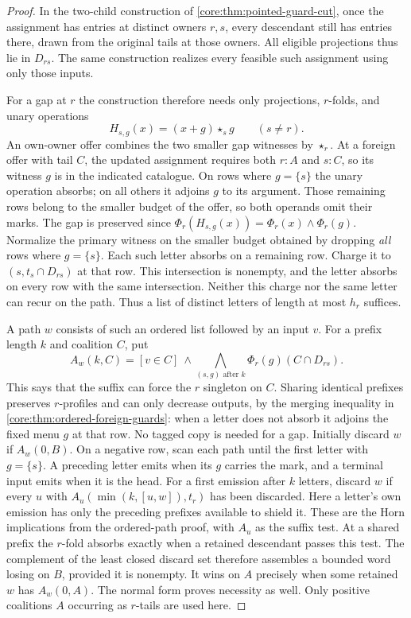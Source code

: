 \begin{proof}
In the two-child construction of \cref{core:thm:pointed-guard-cut},
once the assignment has entries at distinct owners $r,s$, every
descendant still has entries there, drawn from the original tails at
those owners. All eligible projections thus lie in $D_{rs}$.
The same construction realizes every feasible such assignment using
only those inputs.

For a gap at $r$ the construction therefore needs only projections,
$r$-folds, and unary operations
\[
 H_{s,g}(x)=(x+g)\star_s g\qquad (s\ne r).
\]
An own-owner offer combines the two smaller gap witnesses by
$\star_r$. At a foreign offer with tail $C$, the updated assignment
requires both $r:A$ and $s:C$, so its witness $g$ is in the indicated
catalogue. On rows where $g=\{s\}$ the unary operation absorbs; on
all others it adjoins $g$ to its argument. Those remaining rows
belong to the smaller budget of the offer, so both operands omit
their marks. The gap is preserved since $\Phi_r(H_{s,g}(x))=
\Phi_r(x)\land\Phi_r(g)$. Normalize the primary witness on the
smaller budget obtained by dropping \emph{all} rows where $g=\{s\}$.
Each such letter absorbs on a remaining row. Charge it to
$(s,t_s\cap D_{rs})$ at that row. This intersection is nonempty,
and the letter absorbs on every row with the same intersection.
Neither this charge nor the same letter can recur on the path.
Thus a list of distinct letters of length at most $h_r$ suffices.

A path $w$ consists of such an ordered list followed by an input $v$.
For a prefix length $k$ and coalition $C$, put
\[
 A_w(k,C)=[v\in C]\ \land \bigwedge_{(s,g)\text{ after }k}\Phi_r(g)(C\cap D_{rs}).
\]
This says that the suffix can force the $r$ singleton on $C$.
Sharing identical prefixes preserves $r$-profiles and can only
decrease outputs, by the merging inequality in
\cref{core:thm:ordered-foreign-guards}: when a letter does not absorb
it adjoins the fixed menu $g$ at that row. No tagged copy is needed
for a gap. Initially discard $w$ if $A_w(0,B)$. On a negative row,
scan each path until the first letter with $g=\{s\}$.
A preceding letter emits when its $g$ carries the mark, and a terminal
input emits when it is the head. For a first emission after $k$ letters,
discard $w$ if every $u$ with
$A_u(\min(k,[u,w]),t_r)$ has been discarded. Here a letter's own
emission has only the preceding prefixes available to shield it.
These are the Horn implications from the ordered-path proof, with
$A_u$ as the suffix test. At a shared prefix the $r$-fold absorbs
exactly when a retained descendant passes this test. The complement of
the least closed discard set therefore assembles a bounded word losing
on $B$, provided it is nonempty. It wins on $A$ precisely when some
retained $w$ has $A_w(0,A)$. The normal form proves necessity as well.
Only positive coalitions $A$ occurring as $r$-tails are used here.


\end{proof}
